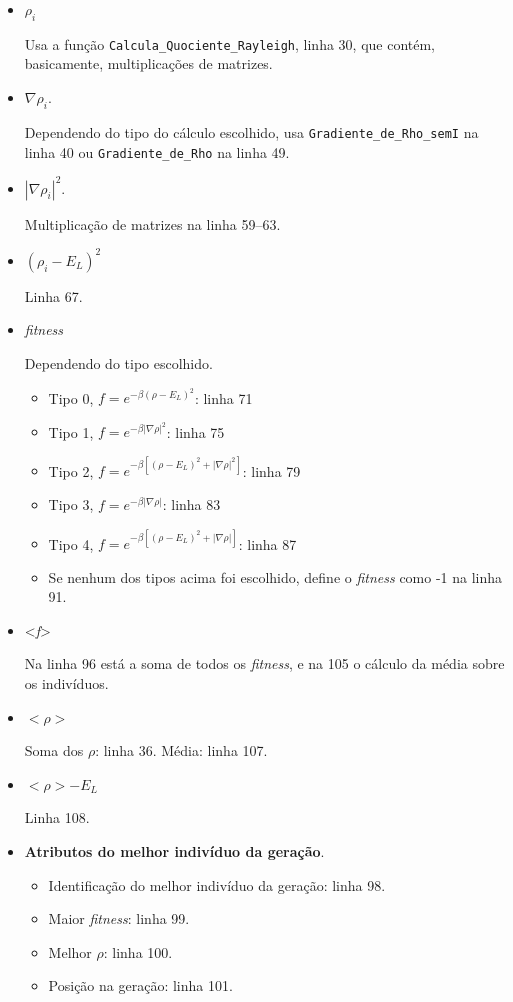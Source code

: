 	\begin{itemize}
	
		\item $\rho_i$
		
		Usa a função \texttt{Calcula\_Quociente\_Rayleigh}, linha 30, que contém, basicamente, multiplicações de matrizes.
		
		\item $\nabla \rho_i$.
		
		Dependendo do tipo do cálculo escolhido, usa \texttt{Gradiente\_de\_Rho\_semI} na linha 40 ou \texttt{Gradiente\_de\_Rho} na linha 49.
		
		\item $|\nabla \rho_i|^2$.
		
		Multiplicação de matrizes na linha 59--63.
		
		\item $(\rho_i - E_L)^2$
		
		Linha 67.
		
		\item \emph{fitness}
		
		Dependendo do tipo escolhido.
		
		\begin{itemize}
			\item Tipo 0, $f = e^{-\beta(\rho - E_L)^2}$: linha 71
			\item Tipo 1, $f = e^{-\beta |\nabla \rho|^2}$: linha 75
			\item Tipo 2, $f = e^{-\beta [(\rho - E_L)^2 + |\nabla \rho|^2]}$: linha 79
			\item Tipo 3, $f = e^{-\beta |\nabla \rho|}$: linha 83
			\item Tipo 4, $f = e^{-\beta [(\rho - E_L)^2 + |\nabla \rho|]}$: linha 87
			\item Se nenhum dos tipos acima foi escolhido, define o \emph{fitness} como -1 na linha 91.
		\end{itemize}
		
		\item <\emph{f}>
		
		Na linha 96 está a soma de todos os \emph{fitness}, e na 105 o cálculo da média sobre os indivíduos.
		
		\item $<\rho>$
		
			Soma dos $\rho$: linha 36. Média: linha 107.
			
		\item \textbf{$<\rho> - E_L$}
			
			Linha 108.
			
		\item \textbf{Atributos do melhor indivíduo da geração}.
		
		\begin{itemize}
			\item Identificação do melhor indivíduo da geração: linha 98.
			\item Maior \emph{fitness}: linha 99.
			\item Melhor $\rho$: linha 100.
			\item Posição na geração: linha 101.
		\end{itemize}
		
	\end{itemize}

